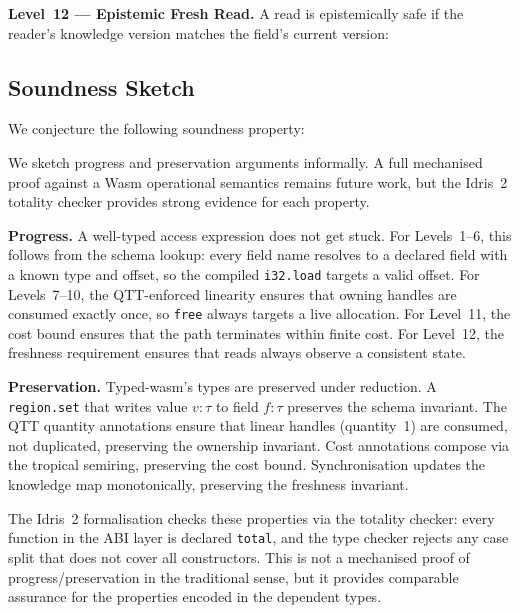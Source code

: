 \documentclass[sigplan,nonacm,screen]{acmart}
\begin{document}
\textbf{Level~12 --- Epistemic Fresh Read.}
A read is epistemically safe if the reader's knowledge version matches
the field's current version:


\subsection{Soundness Sketch}

We conjecture the following soundness property:

We sketch progress and preservation arguments informally. A full
mechanised proof against a Wasm operational semantics remains future work,
but the Idris~2 totality checker provides strong evidence for each
property.

\textbf{Progress.}
A well-typed access expression does not get stuck. For Levels~1--6, this
follows from the schema lookup: every field name resolves to a declared
field with a known type and offset, so the compiled \texttt{i32.load}
targets a valid offset. For Levels~7--10, the QTT-enforced linearity
ensures that owning handles are consumed exactly once, so \texttt{free}
always targets a live allocation. For Level~11, the cost bound ensures
that the path terminates within finite cost. For Level~12, the freshness
requirement ensures that reads always observe a consistent state.

\textbf{Preservation.}
Typed-wasm's types are preserved under reduction. A \texttt{region.set}
that writes value $v : \tau$ to field $f : \tau$ preserves the schema
invariant. The QTT quantity annotations ensure that linear handles
(quantity~1) are consumed, not duplicated, preserving the ownership
invariant. Cost annotations compose via the tropical semiring, preserving
the cost bound. Synchronisation updates the knowledge map monotonically,
preserving the freshness invariant.

The Idris~2 formalisation checks these properties via the totality
checker: every function in the ABI layer is declared \texttt{total}, and
the type checker rejects any case split that does not cover all
constructors. This is not a mechanised proof of progress/preservation in
the traditional sense, but it provides comparable assurance for the
properties encoded in the dependent types.
\end{document}
